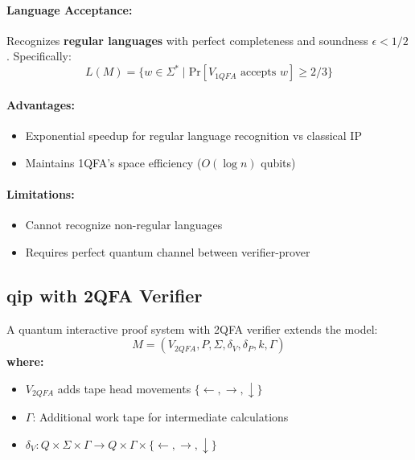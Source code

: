 \paragraph{Language Acceptance:}
Recognizes \textbf{regular languages} with perfect completeness and soundness $\epsilon < 1/2$ \cite{nishimura2009application}. Specifically:
\[
L(M) = \{w \in \Sigma^* \mid \text{Pr}[V_{1QFA} \text{ accepts } w] \geq 2/3\}
\]

\paragraph{Advantages:}
\begin{itemize}
    \item Exponential speedup for regular language recognition vs classical IP
    \item Maintains 1QFA's space efficiency ($O(\log n)$ qubits)
\end{itemize}

\paragraph{Limitations:}
\begin{itemize}
    \item Cannot recognize non-regular languages
    \item Requires perfect quantum channel between verifier-prover
\end{itemize}

\subsection{\acrfull{qip} with 2QFA Verifier}
\label{subsec:qip2qfa}

\begin{definition}
A quantum interactive proof system with 2QFA verifier extends the model:
\[
M = (V_{2QFA}, P, \Sigma, \delta_V, \delta_P, k, \Gamma)
\]
\textbf{where:}
\begin{itemize}
    \item $V_{2QFA}$ adds tape head movements $\{\leftarrow, \rightarrow, \downarrow\}$
    \item $\Gamma$: Additional work tape for intermediate calculations
    \item $\delta_V: Q \times \Sigma \times \Gamma \rightarrow Q \times \Gamma \times \{\leftarrow, \rightarrow, \downarrow\}$
\end{itemize}
\end{definition}

